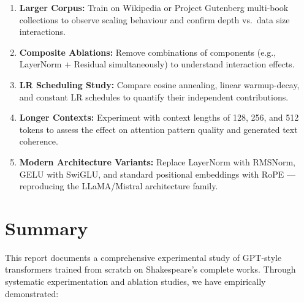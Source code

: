 \documentclass[12pt,a4paper]{article}
\begin{document}
\begin{enumerate}[leftmargin=2cm]
  \item \textbf{Larger Corpus:} Train on Wikipedia or Project Gutenberg multi-book collections to observe scaling behaviour and confirm depth vs.\ data size interactions.

  \item \textbf{Composite Ablations:} Remove combinations of components (e.g., LayerNorm + Residual simultaneously) to understand interaction effects.

  \item \textbf{LR Scheduling Study:} Compare cosine annealing, linear warmup-decay, and constant LR schedules to quantify their independent contributions.

  \item \textbf{Longer Contexts:} Experiment with context lengths of 128, 256, and 512 tokens to assess the effect on attention pattern quality and generated text coherence.

  \item \textbf{Modern Architecture Variants:} Replace LayerNorm with RMSNorm, GELU with SwiGLU, and standard positional embeddings with RoPE — reproducing the LLaMA/Mistral architecture family.
\end{enumerate}

\newpage
\section{Summary}

This report documents a comprehensive experimental study of GPT-style transformers trained from scratch on Shakespeare's complete works. Through systematic experimentation and ablation studies, we have empirically demonstrated:
\end{document}
